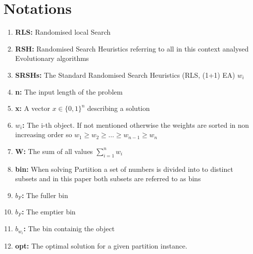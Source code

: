 \section{Notations}
\begin{enumerate}
    \item \textbf{RLS:} Randomised local Search
    \item \textbf{RSH:} Randomised Search Heuristics referring to all in this context analysed Evolutionary algorithms
    \item \textbf{SRSHs:} The Standard Randomised Search Heuristics (RLS, (1+1) EA) $w_i$
    \item \textbf{n:} The input length of the problem
    \item \textbf{x:} A vector $x \in {\{0, 1\}}^n$ describing a solution
    \item \textbf{$w_i$:} The i-th object. If not mentioned otherwise the weights are sorted in non increasing order so \(w_1 \ge w_2 \ge \ldots \ge w_{n-1} \ge w_{n}\)
    \item \textbf{W:} The sum of all values $\sum_{i=1}^{n}w_i$
    \item \textbf{bin:} When solving Partition a set of numbers is divided into to distinct subsets and in this paper both subsets are referred to as bins
    \item \textbf{$b_F$:} The fuller bin
    \item \textbf{$b_F$:} The emptier bin
    \item \textbf{$b_{w_i}$:} The bin containig the object
    \item \textbf{opt:} The optimal solution for a given partition instance.
\end{enumerate}